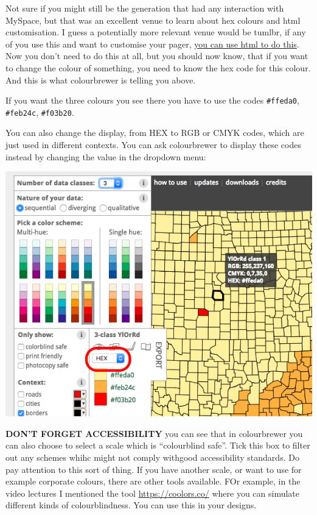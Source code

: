 \documentclass[
]{book}
\begin{document}
Not sure if you might still be the generation that had any interaction with MySpace, but that was an excellent venue to learn about hex colours and html customisation. I guess a potentially more relevant venue would be tumlbr, if any of you use this and want to customise your pager, \href{https://www.tumblr.com/docs/en/custom_themes}{you can use html to do this}. Now you don't need to do this at all, but you should now know, that if you want to change the colour of something, you need to know the hex code for this colour. And this is what colourbrewer is telling you above.

If you want the three colours you see there you have to use the codes \texttt{\#ffeda0}, \texttt{\#feb24c}, \texttt{\#f03b20}.

You can also change the display, from HEX to RGB or CMYK codes, which are just used in different contexts. You can ask colourbrewer to display these codes instead by changing the value in the dropdown menu:

\includegraphics{imgs/choose_col_code.png}

\textbf{DON'T FORGET ACCESSIBILITY} you can see that in colourbrewer you can also choose to select a scale which is ``colourblind safe''. Tick this box to filter out any schemes whihc might not comply withgood accessibility standards. Do pay attention to this sort of thing. If you have another scale, or want to use for example corporate colours, there are other tools available. FOr example, in the video lectures I mentioned the tool \url{https://coolors.co/} where you can simulate different kinds of colourblindness. You can use this in your designs.
\end{document}
